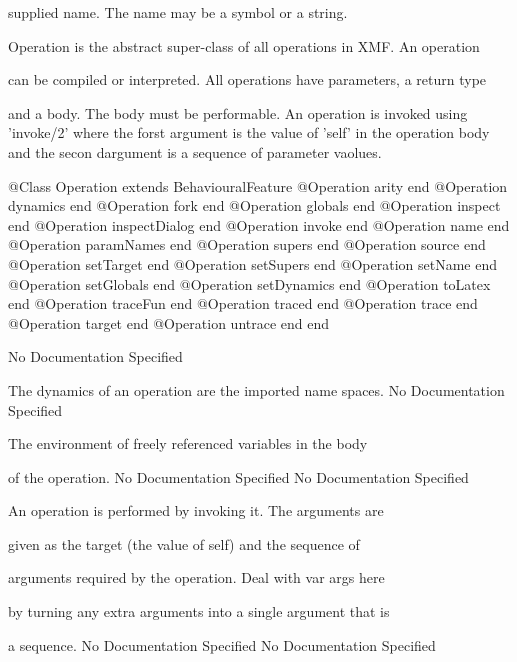       supplied name. The name may be a symbol or a string.

      Operation is the abstract super-class of all operations in XMF. An operation

      can be compiled or interpreted. All operations have parameters, a return type

      and a body. The body must be performable. An operation is invoked using 
      'invoke/2' where the forst argument is the value of 'self' in the operation 
      body and the secon dargument is a sequence of parameter vaolues.
\begin{Interface}
@Class Operation extends BehaviouralFeature
  @Operation arity end
  @Operation dynamics end
  @Operation fork end
  @Operation globals end
  @Operation inspect end
  @Operation inspectDialog end
  @Operation invoke end
  @Operation name end
  @Operation paramNames end
  @Operation supers end
  @Operation source end
  @Operation setTarget end
  @Operation setSupers end
  @Operation setName end
  @Operation setGlobals end
  @Operation setDynamics end
  @Operation toLatex end
  @Operation traceFun end
  @Operation traced end
  @Operation trace end
  @Operation target end
  @Operation untrace end
end
\end{Interface}
No Documentation Specified

      The dynamics of an operation are the imported name spaces.
No Documentation Specified

      The environment of freely referenced variables in the body

      of the operation.
No Documentation Specified
No Documentation Specified

      An operation is performed by invoking it. The arguments are

      given as the target (the value of self) and the sequence of

      arguments required by the operation. Deal with var args here

      by turning any extra arguments into a single argument that is

      a sequence.
No Documentation Specified
No Documentation Specified


